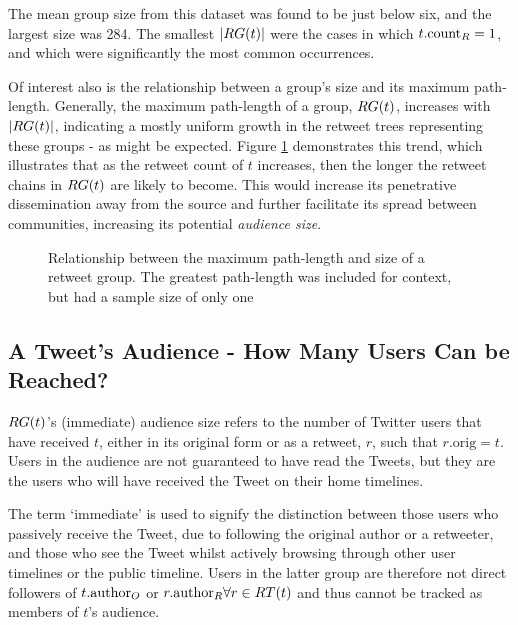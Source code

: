 The mean group size from this dataset was found to be just below six, and the largest size was 284. The smallest $|RG(t)|$ were the cases in which $t.\textrm{count}_R = 1$, and which were significantly the most common occurrences.

Of interest also is the relationship between a group's size and its maximum path-length. Generally, the maximum path-length of a group, $RG(t)$, increases with $|RG(t)|$, indicating a mostly uniform growth in the retweet trees representing these groups - as might be expected. Figure \ref{fig:totalretweets-pathlength} demonstrates this trend, which illustrates that as the retweet count of $t$ increases, then the longer the retweet chains in $RG(t)$ are likely to become. This would increase its penetrative dissemination away from the source and further facilitate its spread between communities, increasing its potential \textit{audience size}.

\begin{figure}[h]
\centering
    \caption{Relationship between the maximum path-length and size of a retweet group. The greatest path-length was included for context, but had a sample size of only one}
\label{fig:totalretweets-pathlength}
\end{figure}

\subsection{A Tweet's Audience - How Many Users Can be Reached?}
\label{section:audience}
$RG(t)$'s (immediate) audience size refers to the number of Twitter users that have received $t$, either in its original form or as a retweet, $r$, such that $r.\textrm{orig} = t$. Users in the audience are not guaranteed to have read the Tweets, but they are the users who will have received the Tweet on their home timelines.

The term `immediate' is used to signify the distinction between those users who passively receive the Tweet, due to following the original author or a retweeter, and those who see the Tweet whilst actively browsing through other user timelines or the public timeline. Users in the latter group are therefore not direct followers of $t.\textrm{author}_O$ or $r.\textrm{author}_R \forall r \in RT(t)$ and thus cannot be tracked as members of $t$'s audience.

